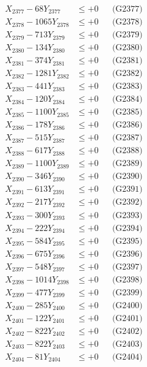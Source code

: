 \documentclass[a4paper,10pt]{article}
\begin{document}
{\begin{align}
X_{2377} - 68Y_{2377} &\leq +0 && \text{(G2377)} \\
X_{2378} - 1065Y_{2378} &\leq +0 && \text{(G2378)} \\
X_{2379} - 713Y_{2379} &\leq +0 && \text{(G2379)} \\
X_{2380} - 134Y_{2380} &\leq +0 && \text{(G2380)} \\
\allowbreak
X_{2381} - 374Y_{2381} &\leq +0 && \text{(G2381)} \\
X_{2382} - 1281Y_{2382} &\leq +0 && \text{(G2382)} \\
X_{2383} - 441Y_{2383} &\leq +0 && \text{(G2383)} \\
X_{2384} - 120Y_{2384} &\leq +0 && \text{(G2384)} \\
X_{2385} - 1100Y_{2385} &\leq +0 && \text{(G2385)} \\
X_{2386} - 178Y_{2386} &\leq +0 && \text{(G2386)} \\
X_{2387} - 515Y_{2387} &\leq +0 && \text{(G2387)} \\
X_{2388} - 617Y_{2388} &\leq +0 && \text{(G2388)} \\
X_{2389} - 1100Y_{2389} &\leq +0 && \text{(G2389)} \\
X_{2390} - 346Y_{2390} &\leq +0 && \text{(G2390)} \\
\allowbreak
X_{2391} - 613Y_{2391} &\leq +0 && \text{(G2391)} \\
X_{2392} - 217Y_{2392} &\leq +0 && \text{(G2392)} \\
X_{2393} - 300Y_{2393} &\leq +0 && \text{(G2393)} \\
X_{2394} - 222Y_{2394} &\leq +0 && \text{(G2394)} \\
X_{2395} - 584Y_{2395} &\leq +0 && \text{(G2395)} \\
X_{2396} - 675Y_{2396} &\leq +0 && \text{(G2396)} \\
X_{2397} - 548Y_{2397} &\leq +0 && \text{(G2397)} \\
X_{2398} - 1014Y_{2398} &\leq +0 && \text{(G2398)} \\
X_{2399} - 477Y_{2399} &\leq +0 && \text{(G2399)} \\
X_{2400} - 285Y_{2400} &\leq +0 && \text{(G2400)} \\
\allowbreak
X_{2401} - 122Y_{2401} &\leq +0 && \text{(G2401)} \\
X_{2402} - 822Y_{2402} &\leq +0 && \text{(G2402)} \\
X_{2403} - 822Y_{2403} &\leq +0 && \text{(G2403)} \\
X_{2404} - 81Y_{2404} &\leq +0 && \text{(G2404)} \\

\end{align}}
\end{document}
